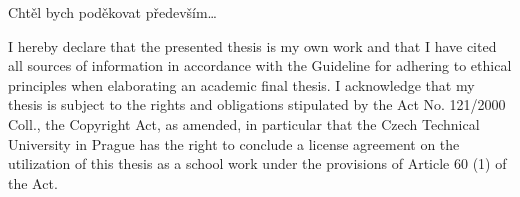 \documentclass[english,bachelor,unicode]{ctufit-thesis}
\theoremstyle{plain}
\theoremstyle{definition}
\theoremstyle{remark}
\numberwithin{theorem}{chapter}
\begin{document}
 
\frontmatter\frontmatterinit %


\thispagestyle{empty}\cleardoublepage\maketitle %

\imprintpage %

\tableofcontents %


\listoffigures %
\begingroup
\let\clearpage\relax
\listoftables %
\lstlistoflistings %
\endgroup


\begin{acknowledgmentpage}
	Chtěl bych poděkovat především\dots
\end{acknowledgmentpage} 


\begin{declarationpage}
    I hereby declare that the presented thesis is my own work and that I have cited all sources of information in accordance with the Guideline
    for adhering to ethical principles when elaborating an academic final thesis.
    I acknowledge that my thesis is subject to the rights and obligations stipulated by the Act No. 121/2000 Coll.,
    the Copyright Act, as amended, in particular that the Czech Technical University in Prague has the right to conclude
    a license agreement on the utilization of this thesis as a school work under the provisions of Article 60 (1) of the Act.
\end{declarationpage}
\end{document}
